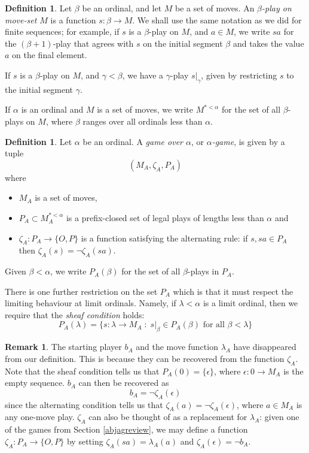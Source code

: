 \documentclass[11pt]{article} %
\theoremstyle{plain} %
\theoremstyle{definition} %
\newtheorem{definition}[theorem]{Definition}
\newtheorem{remark}[theorem]{Remark}
\theoremstyle{exercisestyle}
\newcommand*\from{\colon}
\newcommand{\cmap}[3]{#1\from{}#2\to{}#3}
\newcommand{\suchthat}{\;\colon\;}
\begin{document}
\begin{definition}
  Let $\beta$ be an ordinal, and let $M$ be a set of moves.  An \emph{$\beta$-play on move-set $M$} is a function $\cmap{s}{\beta}{M}$.  We shall use the same notation as we did for finite sequences; for example, if $s$ is a $\beta$-play on $M$, and $a\in M$, we write $sa$ for the $(\beta+1)$-play that agrees with $s$ on the initial segment $\beta$ and takes the value $a$ on the final element.

  If $s$ is a $\beta$-play on $M$, and $\gamma<\beta$, we have a $\gamma$-play $s\vert_\gamma$, given by restricting $s$ to the initial segment $\gamma$.

  If $\alpha$ is an ordinal and $M$ is a set of moves, we write $M^{*<\alpha}$ for the set of all $\beta$-plays on $M$, where $\beta$ ranges over all ordinals less than $\alpha$.  
\end{definition}

\begin{definition}
  Let $\alpha$ be an ordinal.  A \emph{game over $\alpha$}, or \emph{$\alpha$-game}, is given by a tuple
  \[
    (M_A, \zeta_A, P_A)
  \]
  where
  \begin{itemize}
    \item $M_A$ is a set of moves,
    \item $P_A\subset M_A^{*<\alpha}$ is a prefix-closed set of legal plays of lengths less than $\alpha$ and
    \item $\cmap{\zeta_A}{P_A}{\{O,P\}}$ is a function satisfying the alternating rule: if $s,sa\in P_A$ then $\zeta_A(s)=\neg\zeta_A(sa)$.
  \end{itemize}

  Given $\beta<\alpha$, we write $P_A(\beta)$ for the set of all $\beta$-plays in $P_A$.  

  There is one further restriction on the set $P_A$ which is that it must respect the limiting behaviour at limit ordinals.  Namely, if $\lambda<\alpha$ is a limit ordinal, then we require that the \emph{sheaf condition} holds:
  \begin{equation}
    \tag{Sheaf condition}
    P_A(\lambda)=\{\cmap{s}{\lambda}{M_A}\suchthat s\vert_\beta\in P_A(\beta)\textrm{ for all }\beta < \lambda\}
  \end{equation}
\end{definition}

\begin{remark}
  The starting player $b_A$ and the move function $\lambda_A$ have disappeared from our definition.  This is because they can be recovered from the function $\zeta_A$.  Note that the sheaf condition tells us that $P_A(0)=\{\epsilon\}$, where $\cmap{\epsilon}{0}{M_A}$ is the empty sequence.  $b_A$ can then be recovered as
  \[
    b_A=\neg\zeta_A(\epsilon)
  \]
  since the alternating condition tells us that $\zeta_A(a)=\neg\zeta_A(\epsilon)$, where $a\in M_A$ is any one-move play.  $\zeta_A$ can also be thought of as a replacement for $\lambda_A$: given one of the games from Section \ref{abjagreview}, we may define a function $\cmap{\zeta_A}{P_A}{\{O,P\}}$ by setting $\zeta_A(sa)=\lambda_A(a)$ and $\zeta_A(\epsilon)=\neg b_A$.  
\end{remark}
\end{document}
